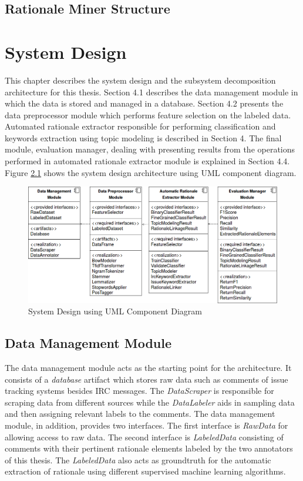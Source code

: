 \documentclass[a4paper,12pt,twoside]{report}
\begin{document}
\section{Rationale Miner Structure}


\chapter{System Design}
This chapter describes the system design and the subsystem decomposition architecture for this thesis. Section 4.1 describes the data management module in which the data is stored and managed in a database. Section 4.2 presents the data preprocessor module which performs feature selection on the labeled data. Automated rationale extractor responsible for performing classification and keywords extraction using topic modeling is described in Section 4. The final module, evaluation manager, dealing with presenting results from the operations performed in automated rationale extractor module is explained in Section 4.4. Figure \ref{fig:systemDecomposition} shows the system design architecture using UML component diagram. 
\begin{figure}[h] %
    \centering
    \includegraphics[width=14cm]{system-decomposition}
    \caption{System Design using UML Component Diagram}
    \label{fig:systemDecomposition}
\end{figure}

\section{Data Management Module}
The data management module acts as the starting point for the architecture. It consists of a \textit{database} artifact which stores raw data such as comments of issue tracking systems besides \acs{IRC} messages. The \textit{DataScraper} is responsible for scraping data from different sources while the \textit{DataLabeler} aids in sampling data and then assigning relevant labels to the comments. The data management module, in addition, provides two interfaces. The first interface is \textit{RawData} for allowing access to raw data. The second interface is \textit{LabeledData} consisting of comments with their pertinent rationale elements labeled by the two annotators of this thesis. The \textit{LabeledData} also acts as groundtruth for the automatic extraction of rationale using different supervised machine learning algorithms. 
\end{document}
